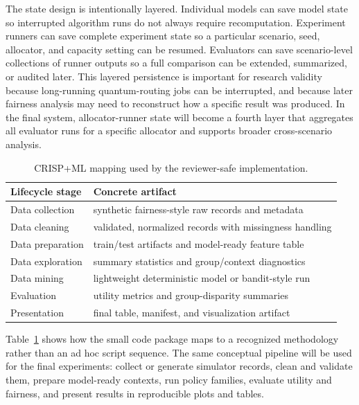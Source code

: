 \documentclass[conference]{IEEEtran}
\begin{document}
The state design is intentionally layered. Individual models can save model
state so interrupted algorithm runs do not always require recomputation.
Experiment runners can save complete experiment state so a particular
scenario, seed, allocator, and capacity setting can be resumed. Evaluators can
save scenario-level collections of runner outputs so a full comparison can be
extended, summarized, or audited later. This layered persistence is important
for research validity because long-running quantum-routing jobs can be
interrupted, and because later fairness analysis may need to reconstruct how a
specific result was produced. In the final system, allocator-runner state will
become a fourth layer that aggregates all evaluator runs for a specific
allocator and supports broader cross-scenario analysis.

\begin{table}[t]
\caption{CRISP+ML mapping used by the reviewer-safe implementation.}
\label{tab:crisp}
\centering
\small
\begin{tabular}{p{}p{}}
\toprule
\textbf{Lifecycle stage} & \textbf{Concrete artifact} \\
\midrule
Data collection & synthetic fairness-style raw records and metadata \\
Data cleaning & validated, normalized records with missingness handling \\
Data preparation & train/test artifacts and model-ready feature table \\
Data exploration & summary statistics and group/context diagnostics \\
Data mining & lightweight deterministic model or bandit-style run \\
Evaluation & utility metrics and group-disparity summaries \\
Presentation & final table, manifest, and visualization artifact \\
\bottomrule
\end{tabular}
\end{table}

Table~\ref{tab:crisp} shows how the small code package maps to a recognized
methodology rather than an ad hoc script sequence. The same conceptual
pipeline will be used for the final experiments: collect or generate simulator
records, clean and validate them, prepare model-ready contexts, run policy
families, evaluate utility and fairness, and present results in reproducible
plots and tables.
\end{document}
